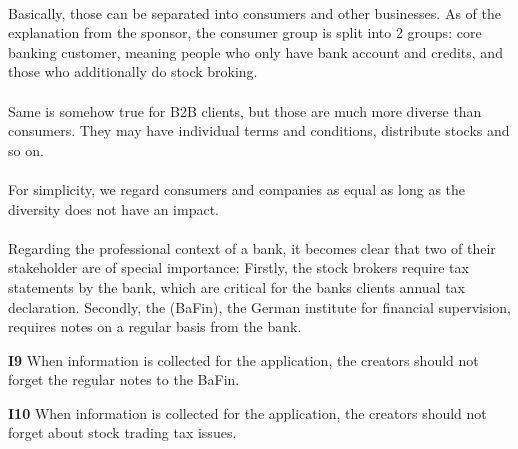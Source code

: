 \paragraph{} Basically, those can be separated into consumers and other businesses. As of the explanation from the sponsor, the consumer group is split into 2 groups: core banking customer, meaning people who only have bank account and credits, and those who additionally do stock broking. 

\paragraph{} Same is somehow true for B2B clients, but those are much more diverse than consumers. They may have individual terms and conditions, distribute stocks and so on. 

\paragraph{} For simplicity, we regard consumers and companies as equal as long as the diversity does not have an impact.

\paragraph{}
Regarding the professional context of a bank, it becomes clear that two of their stakeholder are of special importance: Firstly, the stock brokers require tax statements by the bank, which are critical for the banks clients annual tax declaration. Secondly, the  (BaFin), the German institute for financial supervision, requires notes on a regular basis from the bank.

\begin{closeItem}
    \item [\textbf{I9}] When information is collected for the application, the creators should not forget the regular notes to the BaFin.
    \item [\textbf{I10}] When information is collected for the application, the creators should not forget about stock trading tax issues.
\end{closeItem}

\vspace{2em}


